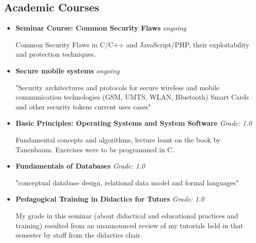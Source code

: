 \documentclass[11pt,a4paper,sans]{moderncv}        %
\begin{document}
\vspace{2pt}

\subsection{Academic Courses}

\vspace{5pt}

\begin{itemize}

\item{\textbf{Seminar Course: Common Security Flaws} \textit{ongoing}

\vspace{2pt}
\small{Common Security Flaws in C/C++ and JavaScript/PHP, their exploitability and protection techniques.}}

\vspace{2pt}

\item{\textbf{Secure mobile systems} \textit{ongoing}

\vspace{2pt}
\small{"Security architectures and protocols for secure wireless and mobile 
communication technologies (GSM, UMTS, WLAN, Bluetooth) Smart Cards and other 
security tokens current uses cases"}}

\vspace{2pt}

\item{\textbf{Basic Principles: Operating Systems and System Software} \textit{Grade: 1.0}

\vspace{2pt}
\small{Fundamental concepts and algorithms, lecture leant on the book by Tanenbaum. Exercises were to be programmed in C.}}

\item{\textbf{Fundamentals of Databases} \textit{Grade: 1.0}

\vspace{2pt}
\small{"conceptual database design, relational data model and formal languages"}}

\item{\textbf{Pedagogical Training in Didactics for Tutors} \textit{Grade: 1.0}

\vspace{2pt}
\small{My grade in this seminar (about didactical and educational practices and training) resulted from an unannounced review of my tutorials held in that semester by staff from the didactics chair.}}


\end{itemize}
\end{document}
